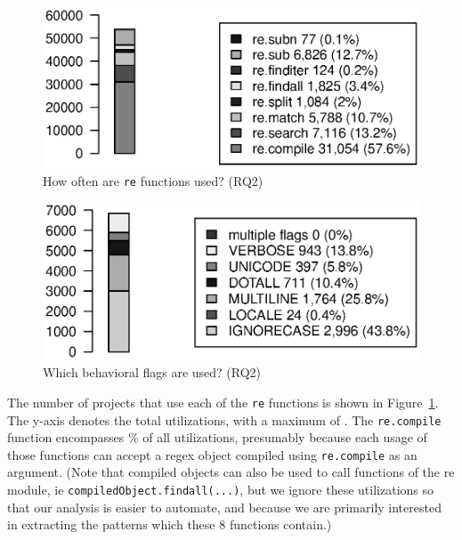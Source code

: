 \begin{figure}[tb]
\centering
\includegraphics[width=\columnwidth]{../analysis_output/partFunctions.eps}
\vspace{-6pt}
\caption{How often are  {\tt re} functions used? (RQ2)}
\vspace{-6pt}
\label{fig:partFunctions}
\end{figure}

\begin{figure}[tb]
\centering
\includegraphics[width=0.9\columnwidth]{../analysis_output/partFlags.eps}
\vspace{-6pt}
\caption{Which behavioral flags are used? (RQ2)}
\label{fig:partFlags}
\end{figure}



The number of projects that use each of the {\tt re} functions is shown in Figure~\ref{fig:partFunctions}.  The y-axis denotes the total utilizations, with a maximum of . The {\tt re.compile} function encompasses \% of all utilizations, presumably because each usage of those functions can accept a regex object compiled using {\tt re.compile} as an argument. (Note that compiled objects can also be used to call functions of the re module, ie {\tt compiledObject.findall(...)}, but we ignore these utilizations so that our analysis is easier to automate, and because we are primarily interested in extracting the patterns which these 8 functions contain.)

